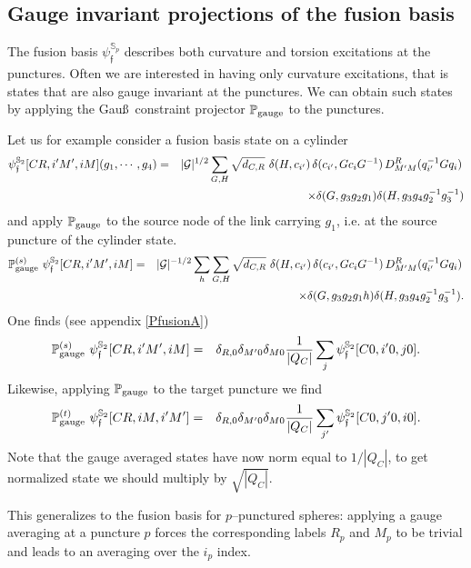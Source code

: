 \documentclass[nofootinbib,superscriptaddress,eqsecnum,tightenlines,11pt]{revtex4-1}
\def\nn{\nonumber}
\def\q{\qquad}
\def\ba{\begin{eqnarray}}
\def\ea{\end{eqnarray}}
\begin{document}
\subsection{Gauge invariant projections of the fusion basis}\label{Pfusion}

The fusion basis  $\psi^{\mathbb{S}_p}_{\mathfrak{f}}$ describes both curvature and torsion excitations at the punctures. Often we are interested in having only curvature excitations, that is states that are also gauge invariant at the punctures.  We can obtain such states by applying the Gau\ss~constraint projector ${\mathbb P}_{\rm gauge}$ to the punctures. 

Let us for example consider a fusion basis state on a cylinder
\ba
\psi^{\mathbb{S}_2}_{\mathfrak{f}}[CR,i'M',iM](g_1,\cdots,g_4)&=&
|{\cal G}|^{1/2} \sum_{G,H} \sqrt{d_{C,R}}\,\, \delta(H,c_{i'}) \, \delta(c_{i'}, Gc_iG^{-1}) \, D^R_{M'M}(q^{-1}_{i'}Gq_i)\, \nn\\&&
\q\q\times \delta(G,g_3g_2g_1) \delta(H,g_3g_4g_2^{-1}g_3^{-1})
\ea
and apply ${\mathbb P}_{\rm gauge}$ to the source node of the link carrying $g_1$, i.e. at the source puncture of the cylinder state. 
\ba
{\mathbb P}^{(s)}_{\rm gauge}\,\,\psi^{\mathbb{S}_2}_{\mathfrak{f}}[CR,i'M',iM]&=&
|{\cal G}|^{-1/2} \sum_{h}\sum_{G,H} \sqrt{d_{C,R}}\,\, \delta(H,c_{i'}) \, \delta(c_{i'}, Gc_iG^{-1}) \, D^R_{M'M}(q^{-1}_{i'}Gq_i)\, \nn\\&&
\q\q\q \times \delta(G,g_3g_2g_1h) \delta(H,g_3g_4g_2^{-1}g_3^{-1})  .
\ea
One finds (see appendix \ref{PfusionA})
\ba
{\mathbb P}^{(s)}_{\rm gauge}\,\,\psi^{\mathbb{S}_2}_{\mathfrak{f}}[CR,i'M',iM]&=&
 \delta_{R,0 } \delta_{M'0} \delta_{M0}  \frac{1}{|Q_C|}\sum_{j}\psi^{\mathbb{S}_2}_{\mathfrak{f}}[C0,i'0,j0]   .
\ea
Likewise, applying ${\mathbb P}_{\rm gauge}$ to the target puncture we find
\ba
{\mathbb P}^{(t)}_{\rm gauge}\,\,\psi^{\mathbb{S}_2}_{\mathfrak{f}}[CR,iM,i'M']&=&
 \delta_{R,0 } \delta_{M'0} \delta_{M0}  \frac{1}{|Q_C|}\sum_{j'}\psi^{\mathbb{S}_2}_{\mathfrak{f}}[C0,j'0,i0]   .
\ea
Note that the gauge averaged states have now norm equal to $1/|Q_C|$, to get normalized state we should multiply by $\sqrt{|Q_C|}$.

This generalizes to the fusion basis for $p$--punctured spheres: applying a gauge averaging at a puncture $p$ forces the corresponding labels $R_p$ and $M_p$ to be trivial and leads to an averaging over the $i_p$ index. 





\end{document}
